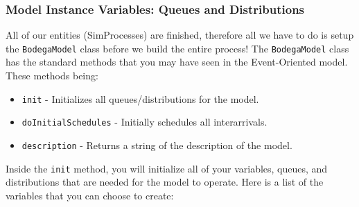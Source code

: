 \documentclass[11pt]{article}
\newcommand{\class}[1]{\texttt{#1}}
\newcommand{\method}[1]{\texttt{#1}}
\begin{document}
\subsubsection*{Model Instance Variables: Queues and Distributions}
All of our entities (SimProcesses) are finished, therefore all we have to do is setup the \class{BodegaModel} class before we build the entire process!
The \class{BodegaModel} class has the standard methods that you may have seen in the Event-Oriented model. These methods being:
\begin{itemize} [noitemsep]
	\item \method{init} - Initializes all queues/distributions for the model.
	\item \method{doInitialSchedules}  - Initially schedules all interarrivals.
	\item \method{description} - Returns a string of the description of the model.
\end{itemize}
Inside the \method{init} method, you will initialize all of your variables, queues, and distributions that are needed for the model to operate. Here is a list of the variables that you can choose to create:
\end{document}
